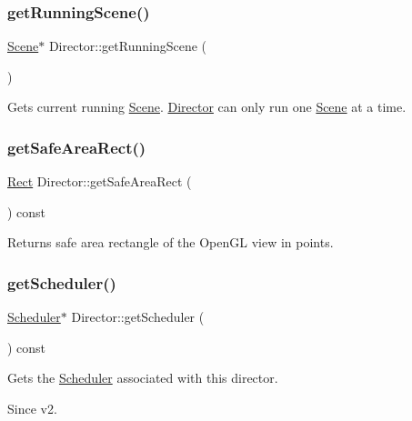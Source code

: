 \subsubsection{\texorpdfstring{get\+Running\+Scene()}{getRunningScene()}\hspace{0.1cm}{\footnotesize\ttfamily [2/2]}}
{\footnotesize\ttfamily \hyperlink{classScene}{Scene}$\ast$ Director\+::get\+Running\+Scene (\begin{DoxyParamCaption}{ }\end{DoxyParamCaption})\hspace{0.3cm}{\ttfamily [inline]}}

Gets current running \hyperlink{classScene}{Scene}. \hyperlink{classDirector}{Director} can only run one \hyperlink{classScene}{Scene} at a time. \mbox{\label{classDirector_a64fae32c207654447373c95bad35de4d}} 
\subsubsection{\texorpdfstring{get\+Safe\+Area\+Rect()}{getSafeAreaRect()}}
{\footnotesize\ttfamily \hyperlink{classRect}{Rect} Director\+::get\+Safe\+Area\+Rect (\begin{DoxyParamCaption}{ }\end{DoxyParamCaption}) const}

Returns safe area rectangle of the Open\+GL view in points. \mbox{\label{classDirector_a9deefa201b7826b4c9960c85a4fa7022}} 
\subsubsection{\texorpdfstring{get\+Scheduler()}{getScheduler()}\hspace{0.1cm}{\footnotesize\ttfamily [1/2]}}
{\footnotesize\ttfamily \hyperlink{classScheduler}{Scheduler}$\ast$ Director\+::get\+Scheduler (\begin{DoxyParamCaption}{ }\end{DoxyParamCaption}) const\hspace{0.3cm}{\ttfamily [inline]}}

Gets the \hyperlink{classScheduler}{Scheduler} associated with this director. \begin{DoxySince}{Since}
v2. 
\end{DoxySince}
\mbox{\label{classDirector_a9deefa201b7826b4c9960c85a4fa7022}} 
